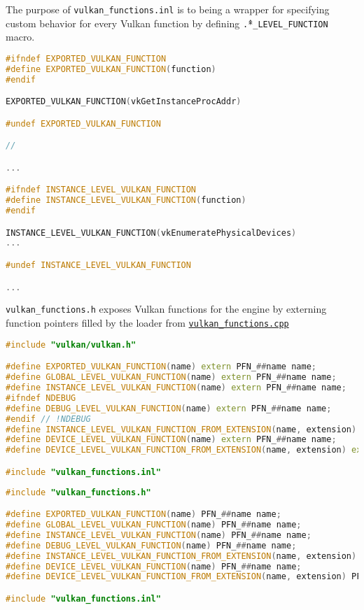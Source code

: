 The purpose of \texttt{vulkan\_functions.inl} is to being a wrapper for specifying custom behavior for every Vulkan function by defining \texttt{\^.*\_LEVEL\_FUNCTION} macro.
\label{lst:vk_functions_inl}
\begin{lstlisting}[language=c++, caption=(./engine/src/vulkan\_tools/vulkan\_functions.inl]
#ifndef EXPORTED_VULKAN_FUNCTION
#define EXPORTED_VULKAN_FUNCTION(function)
#endif

EXPORTED_VULKAN_FUNCTION(vkGetInstanceProcAddr)

#undef EXPORTED_VULKAN_FUNCTION

//

...

#ifndef INSTANCE_LEVEL_VULKAN_FUNCTION
#define INSTANCE_LEVEL_VULKAN_FUNCTION(function)
#endif

INSTANCE_LEVEL_VULKAN_FUNCTION(vkEnumeratePhysicalDevices)
...

#undef INSTANCE_LEVEL_VULKAN_FUNCTION

...
\end{lstlisting}

\texttt{vulkan\_functions.h} exposes Vulkan functions for the engine by externing function pointers filled by the loader from \hyperref[lst:vk_functions_cpp]{\texttt{vulkan\_functions.cpp}}
\begin{lstlisting}[language=c++, caption=(./engine/src/vulkan\_tools/vulkan\_functions.h]
#include "vulkan/vulkan.h"

#define EXPORTED_VULKAN_FUNCTION(name) extern PFN_##name name;
#define GLOBAL_LEVEL_VULKAN_FUNCTION(name) extern PFN_##name name;
#define INSTANCE_LEVEL_VULKAN_FUNCTION(name) extern PFN_##name name;
#ifndef NDEBUG
#define DEBUG_LEVEL_VULKAN_FUNCTION(name) extern PFN_##name name;
#endif // !NDEBUG
#define INSTANCE_LEVEL_VULKAN_FUNCTION_FROM_EXTENSION(name, extension) extern PFN_##name name;
#define DEVICE_LEVEL_VULKAN_FUNCTION(name) extern PFN_##name name;
#define DEVICE_LEVEL_VULKAN_FUNCTION_FROM_EXTENSION(name, extension) extern PFN_##name name;

#include "vulkan_functions.inl"
\end{lstlisting}

\label{lst:vk_functions_cpp}
\begin{lstlisting}[language=c++, caption=(./engine/src/vulkan\_tools/vulkan\_functions.cpp)]
#include "vulkan_functions.h"

#define EXPORTED_VULKAN_FUNCTION(name) PFN_##name name;
#define GLOBAL_LEVEL_VULKAN_FUNCTION(name) PFN_##name name;
#define INSTANCE_LEVEL_VULKAN_FUNCTION(name) PFN_##name name;
#define DEBUG_LEVEL_VULKAN_FUNCTION(name) PFN_##name name;
#define INSTANCE_LEVEL_VULKAN_FUNCTION_FROM_EXTENSION(name, extension) PFN_##name name;
#define DEVICE_LEVEL_VULKAN_FUNCTION(name) PFN_##name name;
#define DEVICE_LEVEL_VULKAN_FUNCTION_FROM_EXTENSION(name, extension) PFN_##name name;

#include "vulkan_functions.inl"
\end{lstlisting}